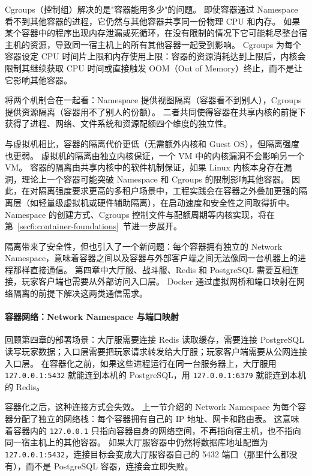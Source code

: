 Cgroups（控制组）解决的是"容器能用多少"的问题。
即使容器通过 Namespace 看不到其他容器的进程，它仍然与其他容器共享同一份物理 CPU 和内存。
如果某个容器中的程序出现内存泄漏或死循环，在没有限制的情况下它可能耗尽整台宿主机的资源，导致同一宿主机上的所有其他容器一起受到影响。
Cgroups 为每个容器设定 CPU 时间片上限和内存使用上限：容器的资源消耗达到上限后，内核会限制其继续获取 CPU 时间或直接触发 OOM（Out of Memory）终止，而不是让它影响其他容器。

将两个机制合在一起看：Namespace 提供视图隔离（容器看不到别人），Cgroups 提供资源隔离（容器用不了别人的份额）。
二者共同使得容器在共享内核的前提下获得了进程、网络、文件系统和资源配额四个维度的独立性。

与虚拟机相比，容器的隔离代价更低（无需额外内核和 Guest OS），但隔离强度也更弱。
虚拟机的隔离由独立内核保证，一个 VM 中的内核漏洞不会影响另一个 VM。
容器的隔离由共享内核中的软件机制保证，如果 Linux 内核本身存在漏洞，理论上一个容器可能突破 Namespace 和 Cgroups 的限制影响其他容器。
因此，在对隔离强度要求更高的多租户场景中，工程实践会在容器之外叠加更强的隔离层（如轻量级虚拟机或硬件辅助隔离），在启动速度和安全性之间取得折中。
Namespace 的创建方式、Cgroups 控制文件与配额周期等内核实现，将在第~\ref{sec6:container-foundations}~节进一步展开。

隔离带来了安全性，但也引入了一个新问题：每个容器拥有独立的 Network Namespace，意味着容器之间以及容器与外部客户端之间无法像同一台机器上的进程那样直接通信。
第四章中大厅服、战斗服、Redis 和 PostgreSQL 需要互相连接，玩家客户端也需要从外部访问入口层。
Docker 通过虚拟网桥和端口映射在网络隔离的前提下解决这两类通信需求。

\paragraph{容器网络：Network Namespace 与端口映射}

回顾第四章的部署场景：大厅服需要连接 Redis 读取缓存，需要连接 PostgreSQL 读写玩家数据；入口层需要把玩家请求转发给大厅服；玩家客户端需要从公网连接入口层。
在容器化之前，如果这些进程运行在同一台服务器上，大厅服用 \texttt{127.0.0.1:5432} 就能连到本机的 PostgreSQL，用 \texttt{127.0.0.1:6379} 就能连到本机的 Redis。

容器化之后，这种连接方式会失效。
上一节介绍的 Network Namespace 为每个容器分配了独立的网络栈：每个容器拥有自己的 IP 地址、网卡和路由表。
这意味着容器内的 \texttt{127.0.0.1} 只指向容器自身的网络空间，不再指向宿主机，也不指向同一宿主机上的其他容器。
如果大厅服容器中仍然将数据库地址配置为 \texttt{127.0.0.1:5432}，连接目标会变成大厅服容器自己的 5432 端口（那里什么都没有），而不是 PostgreSQL 容器，连接会立即失败。

